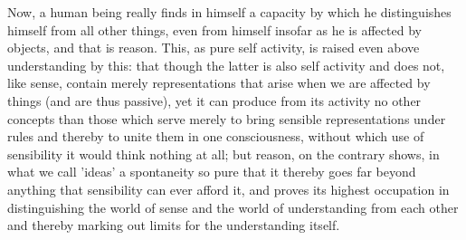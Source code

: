 Now, a human being really finds in himself a capacity by which he distinguishes
himself from all other things, even from himself insofar as he is affected by objects,
and that is reason. This, as pure self activity, is raised even above understanding by this:
that though the latter is also self activity and does not, like sense, contain merely representations
that arise when we are affected by things (and are thus passive),
yet it can produce from its activity no other concepts
than those which serve merely to bring sensible representations under rules
and thereby to unite them in one consciousness,
without which use of sensibility it would think nothing at all;
but reason, on the contrary shows, in what we call 'ideas' a spontaneity
so pure that it thereby goes far beyond anything that sensibility
can ever afford it, and proves its highest occupation in distinguishing
the world of sense and the world of understanding  from each other
and thereby marking out limits for the understanding itself.

